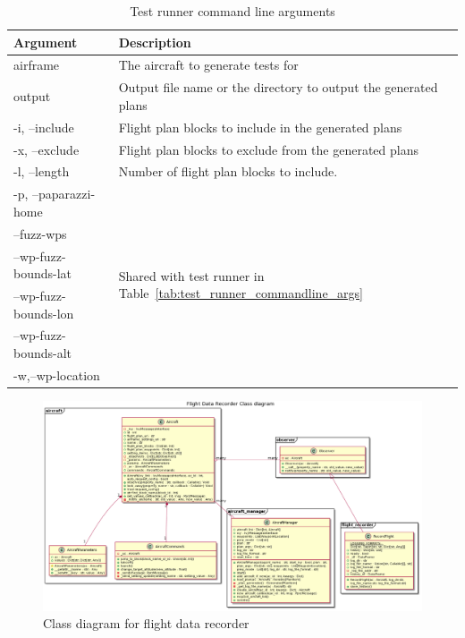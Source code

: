 \begin{table}[]
    \centering
\begin{longtable}{lp{}}
\toprule
\textbf{Argument}   & \textbf{Description}\\ \hline
\endhead
%
\hline
\endfoot
%
\endlastfoot
airframe              &  The aircraft to generate tests for \\
output                &  Output file name or the directory to output the generated plans \\
-i, --include         &  Flight plan blocks to include in the generated plans \\
-x, --exclude         &  Flight plan blocks to exclude from the generated plans \\ 
-l, --length          &  Number of flight plan blocks to include. \\ \hline
-p, --paparazzi-home  &  \multirow{6}{*}{Shared with test runner in Table~\ref{tab:test_runner_commandline_args}}\\
--fuzz-wps            &   \\
--wp-fuzz-bounds-lat  &   \\
--wp-fuzz-bounds-lon  &   \\
--wp-fuzz-bounds-alt  &   \\
-w,--wp-location      &   \\ \bottomrule
\end{longtable}
\caption{Test runner command line arguments}
\label{tab:test_generator_commandline_args}
\end{table}


\begin{landscape}
\begin{figure}[!h]
    \centering
    \includegraphics[width=.7\paperheight]{UML/FDR_class_diagram.png}
    \caption{Class diagram for flight data recorder}
    \label{fig:fdr_class_diagram}
\end{figure}
\end{landscape}

